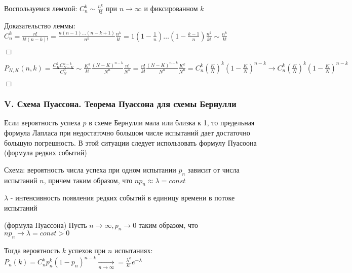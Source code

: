\documentclass[12pt]{article}
\begin{document}
    Воспользуемся леммой: $C^k_n \sim \frac{n^k}{k!}$ при $n \to \infty$ и фиксированном $k$

    Доказательство леммы: $C_n^k = \frac{n!}{k!(n - k)!} = \frac{n(n - 1) \dots (n - k + 1)}{n^k} \frac{n^k}{k!} = 1 \left(1 - \frac{1}{n}\right) \dots \left(1 - \frac{k - 1}{n}\right) \frac{n^k}{k!} \sim \frac{n^k}{k!}$

    \begin{MyProof}
        $\Box$

        $P_{N,K} (n, k) = \frac{C^k_K C_{N - K}^{n - k}}{C^n_N} \sim \frac{K^k}{k!} \frac{(N - K)^{n - k}}{N^n} \frac{n!}{N^n} =
        \frac{n!}{k!} \frac{(N - K)^{n - k}}{N^n} \frac{K^k}{N^n} = C^k_n \left(\frac{K}{N}\right)^k \left(1 - \frac{K}{N}\right)^{n - k} \to C^k_n \left(\frac{K}{N}\right)^k \left(1 - \frac{K}{N}\right)^{n - k} $

        $\Box$
    \end{MyProof}

    \hypertarget{poissonschema}{}

    \subsubsection{V. Схема Пуассона. Теорема Пуассона для схемы Бернулли}

    \Nota Если вероятность успеха $p$ в схеме Бернулли мала или близка к 1, то предельная формула Лапласа при недостаточно большом
    числе испытаний дает достаточно большую погрешность. В этой ситуации следует использовать формулу Пуасоона (формула редких событий)

    Схема: вероятность числа успеха при одном испытании $p_n$ зависит от числа испытаний $n$, причем таким образом, что $n p_n \approx \lambda = const$

    $\lambda$ - интенсивность появления редких событий в единицу времени в потоке испытаний

    \begin{MyTheorem}
         (формула Пуассона) Пусть $n \to \infty, p_n \to 0$ таким образом, что $n p_n \to \lambda = const > 0$

        Тогда вероятность $k$ успехов при $n$ испытаниях: $P_n(k) = C^k_n p_n^k (1 - p_n)^{n - k} \underset{n \to \infty}{\rightarrow} = \frac{\lambda^k}{k!} e^{-\lambda}$
    \end{MyTheorem}
\end{document}
